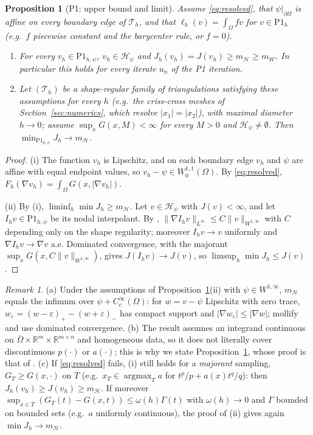 \documentclass[11pt]{amsart}
\newtheorem{proposition}[theorem]{Proposition}
\theoremstyle{definition}
\theoremstyle{remark}
\newtheorem{remark}[theorem]{Remark}
\numberwithin{equation}{section}
\newcommand{\R}{\mathbb{R}}
\newcommand{\abs}[1]{\lvert #1\rvert}
\newcommand{\norm}[1]{\lVert #1\rVert}
\newcommand{\Pone}{\mathrm{P1}}
\newcommand{\Th}{\mathcal T_h}
\newcommand{\Hc}{\mathcal H}
\newcommand{\mW}{m_{\mathcal W}}
\newcommand{\mH}{m_{\mathcal H}}
\begin{document}
\begin{proposition}[P1: upper bound and limit]\label{prop:P1}
Assume \eqref{eq:resolved}, that $\psi|_{\partial\Omega}$ is affine on every boundary edge of $\Th$, and that $\ell_h(v)=\int_\Omega fv$ for $v\in \Pone_h$ \textup(e.g.\ $f$ piecewise constant and the barycenter rule, or $f=0$\textup).
\begin{enumerate}[label=\textup{(\roman*)}]
\item For every $v_h\in \Pone_{h,\psi}$, $v_h\in\Hc_\psi$ and $J_h(v_h)=J(v_h)\ge\mH\ge\mW$. In particular this holds for every iterate $u_n$ of the P1 iteration.
\item Let $(\Th)$ be a shape-regular family of triangulations satisfying these assumptions for every $h$ \textup(e.g.\ the criss-cross meshes of Section~\ref{sec:numerics}, which resolve $\abs{x_1}=\abs{x_2}$\textup), with maximal diameter $h\to0$; assume $\sup_xG(x,M)<\infty$ for every $M>0$ and $\Hc_\psi\neq\emptyset$. Then $\min_{\Pone_{h,\psi}}J_h\to\mH$.
\end{enumerate}
\end{proposition}
\begin{proof}
(i) The function $v_h$ is Lipschitz, and on each boundary edge $v_h$ and $\psi$ are affine with equal endpoint values, so $v_h-\psi\in W^{1,1}_0(\Omega)$. By \eqref{eq:resolved}, $F_h(\nabla v_h)=\int_\Omega G(x,\abs{\nabla v_h})$.

(ii) By (i), $\liminf_h\min J_h\ge\mH$. Let $v\in\Hc_\psi$ with $J(v)<\infty$, and let $I_hv\in \Pone_{h,\psi}$ be its nodal interpolant. By \cite[Lemma~2.1]{CarstensenOrtner2010}, $\norm{\nabla I_hv}_{L^\infty}\le C\norm v_{W^{1,\infty}}$ with $C$ depending only on the shape regularity; moreover $I_hv\to v$ uniformly and $\nabla I_hv\to\nabla v$ a.e. Dominated convergence, with the majorant $\sup_xG(x,C\norm v_{W^{1,\infty}})$, gives $J(I_hv)\to J(v)$, so $\limsup_h\min J_h\le J(v)$.
\end{proof}

\begin{remark}\label{rem:Lip-smooth}
(a) Under the assumptions of Proposition~\ref{prop:P1}(ii) with $\psi\in W^{1,\infty}$, $\mH$ equals the infimum over $\psi+C^\infty_c(\Omega)$: for $w=v-\psi$ Lipschitz with zero trace, $w_\varepsilon=(w-\varepsilon)_+-(w+\varepsilon)_-$ has compact support and $\abs{\nabla w_\varepsilon}\le\abs{\nabla w}$; mollify and use dominated convergence.
(b) The result \cite[Thm.~2.1]{CarstensenOrtner2010} assumes an integrand continuous on $\overline\Omega\times\R^m\times\R^{m\times n}$ and homogeneous data, so it does not literally cover discontinuous $p(\cdot)$ or $a(\cdot)$; this is why we state Proposition~\ref{prop:P1}, whose proof is that of \cite{CarstensenOrtner2010}.
(c) If \eqref{eq:resolved} fails, (i) still holds for a \emph{majorant} sampling, $G_T\ge G(x,\cdot)$ on $T$ (e.g.\ $x_T\in\operatorname{argmax}_Ta$ for $t^p/p+a(x)t^q/q$): then $J_h(v_h)\ge J(v_h)\ge\mH$. If moreover $\sup_{x\in T}(G_T(t)-G(x,t))\le\omega(h)\Gamma(t)$ with $\omega(h)\to0$ and $\Gamma$ bounded on bounded sets (e.g.\ $a$ uniformly continuous), the proof of (ii) gives again $\min J_h\to\mH$.
\end{remark}
\end{document}
